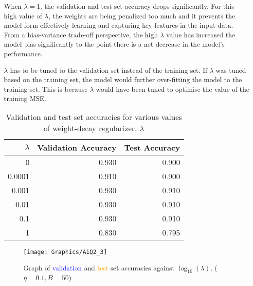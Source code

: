 \documentclass[a4paper,12pt]{article}
\begin{document}
When $\lambda = 1$, the validation and test set accuracy drops significantly. For this high value of $\lambda$, the weights are being penalized too much and it prevents the model form effectively learning and capturing key features in the input data. From a bias-variance trade-off perspective, the high $\lambda$ value has increased the model bias significantly to the point there is a net decrease in the model's performance. 

$\lambda$ has to be tuned to the validation set instead of the training set. If $\lambda$ was tuned based on the training set, the model would further over-fitting the model to the training set. This is because $\lambda$ would have been tuned to optimise the value of the training MSE.

\begin{table}[ht]
	\centering %
    \caption{Validation and test set accuracies for various values of 
    	weight-decay regularizer, $\lambda$}
	\label{table:modelAccuracies} %
    \vspace{1em}
	\begin{tabular}{r|r r}
		\toprule
		$\lambda$ & Validation Accuracy & Test Accuracy \\
        \hline
        0 & 0.930 & 0.900 \\
        0.0001 & 0.910 & 0.900 \\
        0.001 & 0.930 & 0.910 \\
        0.01 & 0.930 & 0.910 \\
        0.1 & 0.930 & 0.910 \\
        1 & 0.830 & 0.795 \\
        [1ex] %
		\hline
	\end{tabular}
\end{table}
\begin{figure}[!htb]
	\centering
	\texttt{[image: Graphics/A1Q2\_3]}
    \caption{\label{figure:modelAccuracies} Graph of 
    \textcolor{blue}{validation} and \textcolor{orange}{test} set accuracies
    against $\log_{10}(\lambda)$. ($\eta = 0.1, B = 50$)}
\end{figure} 
\clearpage
\end{document}
